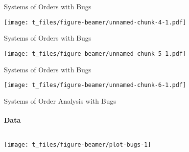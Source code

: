 \documentclass[ignorenonframetext,t]{beamer}
\begin{document}
\begin{frame}{Systems of Orders with Bugs}

\vspace*{.5cm}

\texttt{[image: t\_files/figure-beamer/unnamed-chunk-4-1.pdf]}

\end{frame}

\begin{frame}{Systems of Orders with Bugs}

\vspace*{.5cm}

\texttt{[image: t\_files/figure-beamer/unnamed-chunk-5-1.pdf]}

\end{frame}

\begin{frame}{Systems of Orders with Bugs}

\vspace*{.5cm}

\texttt{[image: t\_files/figure-beamer/unnamed-chunk-6-1.pdf]}

\end{frame}

\begin{frame}{Systems of Order Analysis with Bugs}

\framesubtitle{Data}

\vspace*{.5cm}

\begin{columns}













\begin{center}\texttt{[image: t\_files/figure-beamer/plot-bugs-1]} \end{center}

\end{columns}

\end{frame}
\end{document}
